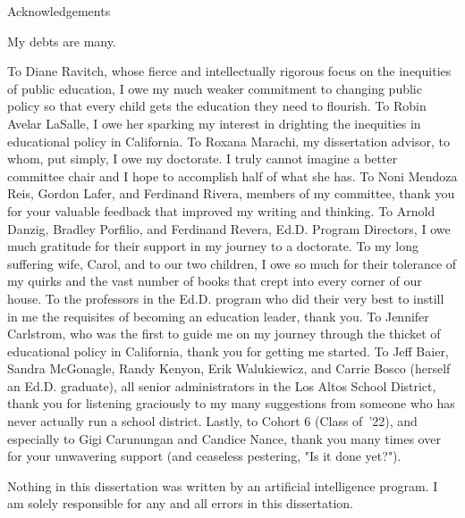 
\begin{center}
  Acknowledgements
\end{center}

\indent%
My debts are many.
  
To Diane Ravitch, whose fierce and intellectually rigorous focus on the inequities of public education, I owe my much weaker commitment to changing public policy so that every child gets the education they need to flourish. To Robin Avelar LaSalle, I owe her sparking my interest in drighting the inequities in educational policy in California. To Roxana Marachi, my dissertation advisor, to whom, put simply, I owe my doctorate. I truly cannot imagine a better committee chair and I hope to accomplish half of what she has. To Noni Mendoza Reis, Gordon Lafer, and Ferdinand Rivera, members of my committee, thank you for your valuable feedback that improved my writing and thinking. To Arnold Danzig, Bradley Porfilio, and Ferdinand Revera, Ed.D. Program Directors, I owe much gratitude for their support in my journey to a doctorate. To my long suffering wife, Carol, and to our two children, I owe so much for their tolerance of my quirks and the vast number of books that crept into every corner of our house. To the professors in the Ed.D. program who did their very best to instill in me the requisites of becoming an education leader, thank you. To Jennifer Carlstrom, who was the first to guide me on my journey through the thicket of educational policy in California, thank you for getting me started. To Jeff Baier, Sandra McGonagle, Randy Kenyon, Erik Walukiewicz, and Carrie Bosco (herself an Ed.D. graduate), all senior administrators in the Los Altos School District, thank you for listening graciously to my many suggestions from someone who has never actually run a school district. Lastly, to Cohort 6 (Class of '22), and especially to Gigi Carunungan and Candice Nance, thank you many times over for your unwavering support (and ceaseless pestering, "Is it done yet?").

Nothing in this dissertation was written by an artificial intelligence program. I am solely responsible for any and all errors in this dissertation.

